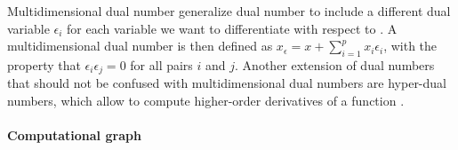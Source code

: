 Multidimensional dual number generalize dual number to include a different dual variable $\epsilon_i$ for each variable we want to differentiate with respect to \cite{Neuenhofen_2018, RevelsLubinPapamarkou2016}.
A multidimensional dual number is then defined as $x_\epsilon = x + \sum_{i=1}^p x_i \epsilon_i$, with the property that $\epsilon_i \epsilon_j = 0$ for all pairs $i$ and $j$.
Another extension of dual numbers that should not be confused with multidimensional dual numbers are hyper-dual numbers, which allow to compute higher-order derivatives of a function \cite{fike2013multi}. 


\paragraph{Computational graph}


